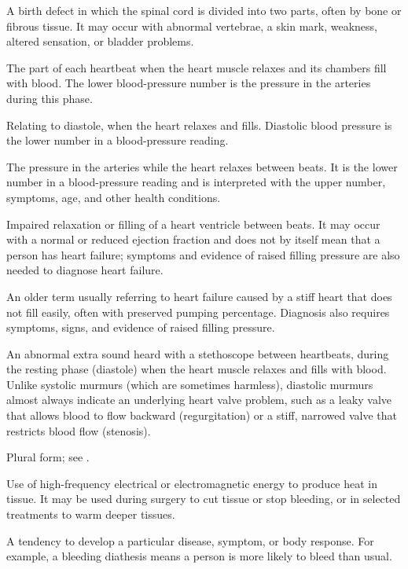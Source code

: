  A birth defect in which the spinal cord is divided into two parts, often by bone or fibrous tissue. It may occur with abnormal vertebrae, a skin mark, weakness, altered sensation, or bladder problems.

 The part of each heartbeat when the heart muscle relaxes and its chambers fill with blood. The lower blood-pressure number is the pressure in the arteries during this phase.

 Relating to diastole, when the heart relaxes and fills. Diastolic blood pressure is the lower number in a blood-pressure reading.

 The pressure in the arteries while the heart relaxes between beats. It is the lower number in a blood-pressure reading and is interpreted with the upper number, symptoms, age, and other health conditions.

 Impaired relaxation or filling of a heart ventricle between beats. It may occur with a normal or reduced ejection fraction and does not by itself mean that a person has heart failure; symptoms and evidence of raised filling pressure are also needed to diagnose heart failure.

 An older term usually referring to heart failure caused by a stiff heart that does not fill easily, often with preserved pumping percentage. Diagnosis also requires symptoms, signs, and evidence of raised filling pressure.

 An abnormal extra sound heard with a stethoscope between heartbeats, during the resting phase (diastole) when the heart muscle relaxes and fills with blood. Unlike systolic murmurs (which are sometimes harmless), diastolic murmurs almost always indicate an underlying heart valve problem, such as a leaky valve that allows blood to flow backward (regurgitation) or a stiff, narrowed valve that restricts blood flow (stenosis).

 Plural form; see .

 Use of high-frequency electrical or electromagnetic energy to produce heat in tissue. It may be used during surgery to cut tissue or stop bleeding, or in selected treatments to warm deeper tissues.

 A tendency to develop a particular disease, symptom, or body response. For example, a bleeding diathesis means a person is more likely to bleed than usual.

